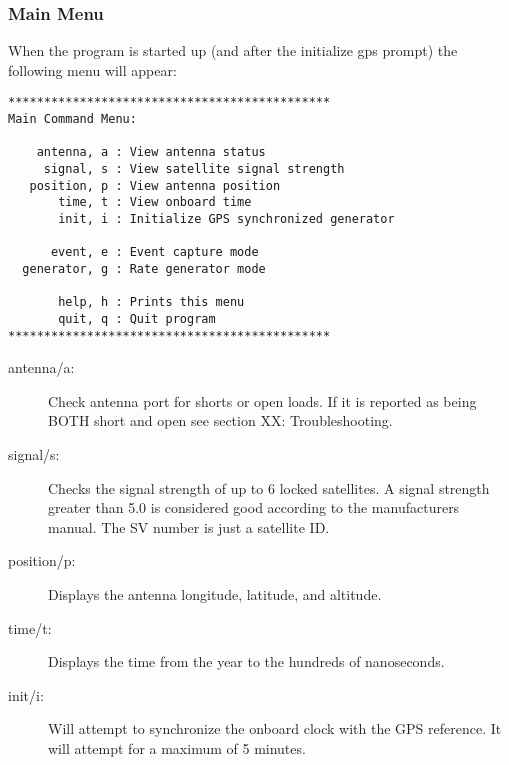 \documentclass[11pt]{article}
\begin{document}
    \subsubsection{Main Menu} \label{mainmenu}
    When the program is started up (and after the initialize gps prompt) the following menu will appear:
    \begin{verbatim}
*********************************************
Main Command Menu:

    antenna, a : View antenna status
     signal, s : View satellite signal strength
   position, p : View antenna position
       time, t : View onboard time
       init, i : Initialize GPS synchronized generator

      event, e : Event capture mode
  generator, g : Rate generator mode

       help, h : Prints this menu
       quit, q : Quit program
*********************************************
    \end{verbatim}

    \begin{description}
        \item [antenna/a:] Check antenna port for shorts or open loads. If it is reported as being BOTH short and open see section XX: Troubleshooting.

        \item [signal/s:] Checks the signal strength of up to 6 locked satellites. A signal strength greater than 5.0 is considered good according to the manufacturers manual. The SV number is just a satellite ID.

        \item [position/p:] Displays the antenna longitude, latitude, and altitude.

        \item [time/t:] Displays the time from the year to the hundreds of nanoseconds.

        \item [init/i:] Will attempt to synchronize the onboard clock with the GPS reference. It will attempt for a maximum of 5 minutes.

    \end{description}

\end{document}

